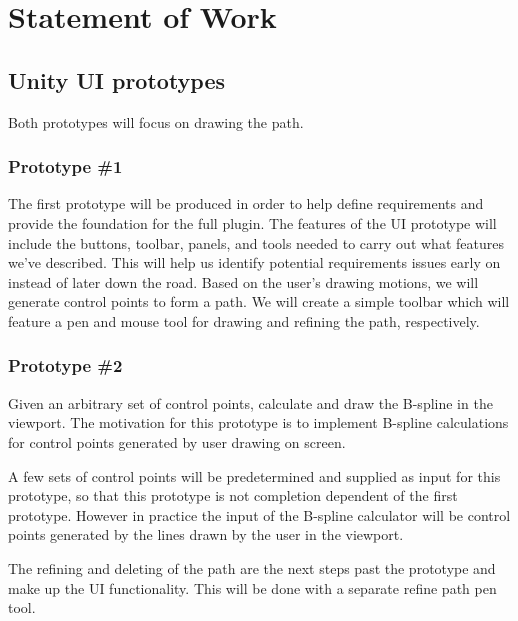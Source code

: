 \section{Statement of Work}
\label{sec:work}
\subsection{Unity UI prototypes}
Both prototypes will focus on drawing the path.

\subsubsection{Prototype \#1} 
\label{sec:ptype1}
The first prototype will be produced in order to help define requirements and provide the foundation for the full plugin. The features of the UI prototype will include the buttons, toolbar, panels, and tools needed to carry out what features we've described. This will help us identify potential requirements issues early on instead of later down the road. Based on the user's drawing motions, we will generate control points to form a path. We will create a simple toolbar which will feature a pen and mouse tool for drawing and refining the path, respectively. 

\subsubsection{Prototype \#2} 
\label{sec:ptype2}
Given an arbitrary set of control points, calculate and draw the B-spline in the viewport. The motivation for this prototype is to implement B-spline calculations for control points generated by user drawing on screen.

A few sets of control points will be predetermined and supplied as input for this prototype, so that this prototype is not completion dependent of the first prototype. However in practice the input of the B-spline calculator will be control points generated by the lines drawn by the user in the viewport.

The refining and deleting of the path are the next steps past the prototype and make up the UI functionality. This will be done with a separate refine path pen tool.
